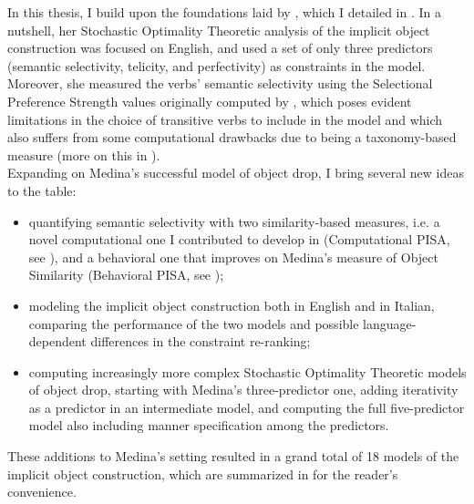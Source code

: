 In this thesis, I build upon the foundations laid by \textcite{Medina2007}, which I detailed in . In a nutshell, her Stochastic Optimality Theoretic analysis of the implicit object construction was focused on English, and used a set of only three predictors (semantic selectivity, telicity, and perfectivity) as constraints in the model. Moreover, she measured the verbs' semantic selectivity using the Selectional Preference Strength values originally computed by \textcite{Resnik1993,Resnik1996}, which poses evident limitations in the choice of transitive verbs to include in the model and which also suffers from some computational drawbacks due to being a taxonomy-based measure (more on this in ).\\
Expanding on Medina's successful model of object drop, I bring several new ideas to the table:
\begin{itemize}
    \item quantifying semantic selectivity with two similarity-based measures, i.e. a novel computational one I contributed to develop in \textcite{CappelliLenciPISA} (Computational PISA, see ), and a behavioral one that improves on Medina's measure of Object Similarity (Behavioral PISA, see );
    \item modeling the implicit object construction both in English and in Italian, comparing the performance of the two models and possible language-dependent differences in the constraint re-ranking;
    \item computing increasingly more complex Stochastic Optimality Theoretic models of object drop, starting with Medina's three-predictor one, adding iterativity as a predictor in an intermediate model, and computing the full five-predictor model also including manner specification among the predictors.
\end{itemize}
These additions to Medina's setting resulted in a grand total of 18 models of the implicit object construction, which are summarized in  for the reader's convenience.



